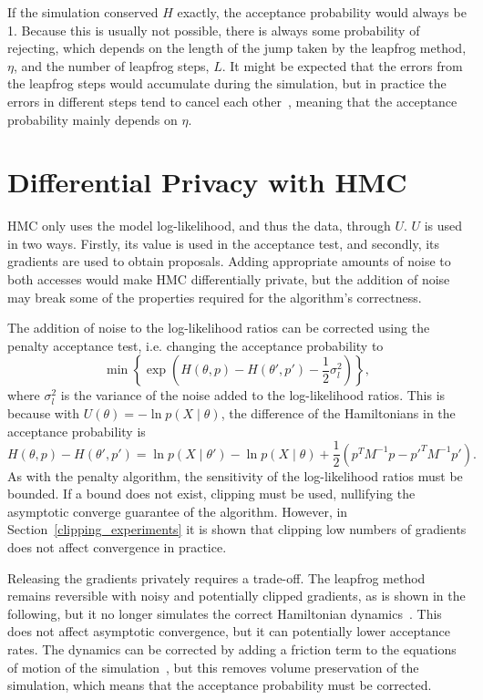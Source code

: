 \documentclass[english,twoside,openright]{HYgraduMLDS}
\begin{document}
If the simulation conserved \(H\) exactly, the acceptance probability would 
always be 1. Because this is usually not possible, there is always some probability 
of rejecting, which depends on the length of the jump taken by the leapfrog 
method, \(\eta\), and the number of leapfrog steps, \(L\). It might be expected 
that the errors from the leapfrog steps would accumulate during the simulation, 
but in practice the errors in different steps tend to cancel each 
other~\cite{neal2012mcmc}, meaning 
that the acceptance probability mainly depends on \(\eta\).

\section{Differential Privacy with HMC}\label{dp_hmc_section}

HMC only uses the model log-likelihood, and thus the data, through \(U\).
\(U\) is used in two ways. Firstly, its value is used in the acceptance test,
and secondly, its gradients are used to obtain proposals. Adding appropriate
amounts of noise to both accesses would make HMC differentially private, but the addition of
noise may break some of the properties required for the algorithm's correctness.

The addition of noise to the log-likelihood ratios can be corrected using the penalty
acceptance test, i.e. changing the acceptance probability to
\[
    \min\left\{\exp\left(H(\theta, p) - H(\theta', p') - \frac{1}{2}\sigma_{l}^{2}\right)\right\},
\]
where \(\sigma_{l}^{2}\) is the variance of the noise added to the log-likelihood
ratios. This is because with \(U(\theta) = -\ln p(X\mid \theta)\), the difference
of the Hamiltonians in the acceptance probability is
\[
  H(\theta, p) - H(\theta', p') = \ln p(X\mid \theta') - \ln p(X\mid \theta)
  + \frac{1}{2}(p^{T}M^{-1}p - p'^{T}M^{-1}p').
\]
As with the penalty algorithm, the sensitivity of the log-likelihood ratios must
be bounded. If a bound does not exist, clipping must be used, nullifying the asymptotic
converge guarantee of the algorithm. However, in Section~\ref{clipping_experiments}
it is shown that
clipping low numbers of gradients does not affect convergence in practice.

Releasing the gradients privately requires a trade-off. The leapfrog method remains
reversible with noisy and potentially clipped gradients, as is shown in the following,
but it no longer simulates the correct Hamiltonian dynamics~\cite{CFG14}. This does not affect
asymptotic convergence, but it can potentially lower acceptance rates.
The dynamics can be corrected by adding a friction term to the equations of
motion of the simulation~\cite{CFG14}, but this removes volume preservation of the simulation,
which means that the acceptance probability must be corrected.
\end{document}
